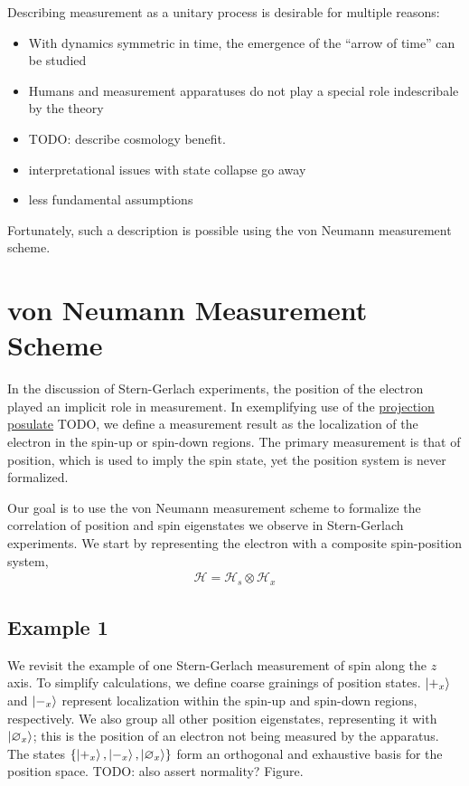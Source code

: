Describing measurement as a unitary process is desirable for multiple reasons:
\begin{itemize}
  \item With dynamics symmetric in time, the emergence of the ``arrow of time'' can be studied
  \item Humans and measurement apparatuses do not play a special role indescribale by the theory
  \item TODO: describe cosmology benefit.
  \item interpretational issues with state collapse go away
  \item less fundamental assumptions
\end{itemize}

Fortunately, such a description is possible using the von Neumann measurement scheme.

\section{von Neumann Measurement Scheme}
In the discussion of Stern-Gerlach experiments, the position of the electron played an implicit role in measurement. In exemplifying use of the \hyperref[projection postulate]{projection posulate} TODO, we define a measurement result as the localization of the electron in the spin-up or spin-down regions. The primary measurement is that of position, which is used to imply the spin state, yet the position system is never formalized.

Our goal is to use the von Neumann measurement scheme to formalize the correlation of position and spin eigenstates we observe in Stern-Gerlach experiments. We start by representing the electron with a composite spin-position system,
\begin{align}
  \mathcal{H} = \mathcal{H}_s \otimes \mathcal{H}_x
\end{align}

\subsection{Example 1}
We revisit the example of one Stern-Gerlach measurement of spin along the $z$ axis. To simplify calculations, we define coarse grainings of position states. $\ket{+_x}$ and $\ket{-_x}$ represent localization within the spin-up and spin-down regions, respectively. We also group all other position eigenstates, representing it with $\ket{\varnothing_x}$; this is the position of an electron not being measured by the apparatus. The states $\{\ket{+_x}, \ket{-_x}, \ket{\varnothing_x}\}$ form an orthogonal and exhaustive basis for the position space. TODO: also assert normality? Figure.

